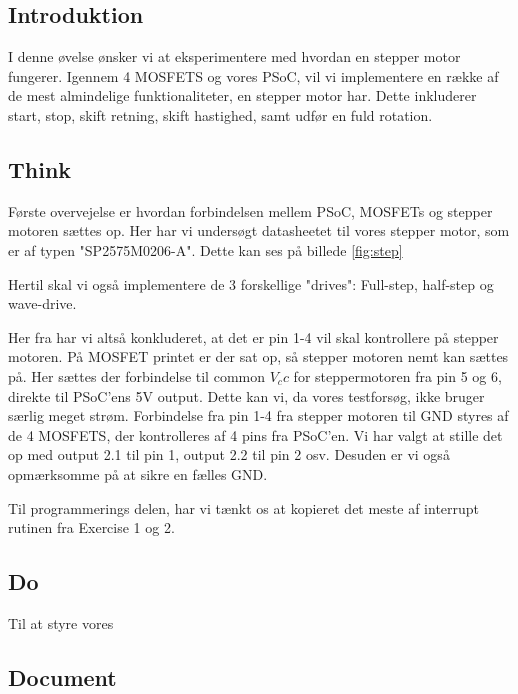 \documentclass[../main.tex]{subfiles}
\begin{document}
\subsection{Introduktion}
I denne øvelse ønsker vi at eksperimentere med hvordan en stepper motor fungerer. Igennem 4 MOSFETS og vores PSoC, vil vi implementere en række af de mest almindelige funktionaliteter, en stepper motor har. Dette inkluderer start, stop, skift retning, skift hastighed, samt udfør en fuld rotation.

\subsection{Think}
Første overvejelse er hvordan forbindelsen mellem PSoC, MOSFETs og stepper motoren sættes op. Her har vi undersøgt datasheetet til vores stepper motor, som er af typen "SP2575M0206-A". Dette kan ses på billede \ref{fig:step}


Hertil skal vi også implementere de 3 forskellige "drives": Full-step, half-step og wave-drive.

Her fra har vi altså konkluderet, at det er pin 1-4 vil skal kontrollere på stepper motoren. På MOSFET printet er der sat op, så stepper motoren nemt kan sættes på. Her sættes der forbindelse til common $V_cc$ for steppermotoren fra pin 5 og 6, direkte til PSoC'ens 5V output. Dette kan vi, da vores testforsøg, ikke bruger særlig meget strøm. Forbindelse fra pin 1-4 fra stepper motoren til GND styres af de 4 MOSFETS, der kontrolleres af 4 pins fra PSoC'en. Vi har valgt at stille det op med output 2.1 til pin 1, output 2.2 til pin 2 osv. Desuden er vi også opmærksomme på at sikre en fælles GND.

Til programmerings delen, har vi tænkt os at kopieret det meste af interrupt rutinen fra Exercise 1 og 2.

\subsection{Do}
Til at styre vores 




\subsection{Document}
\end{document}
